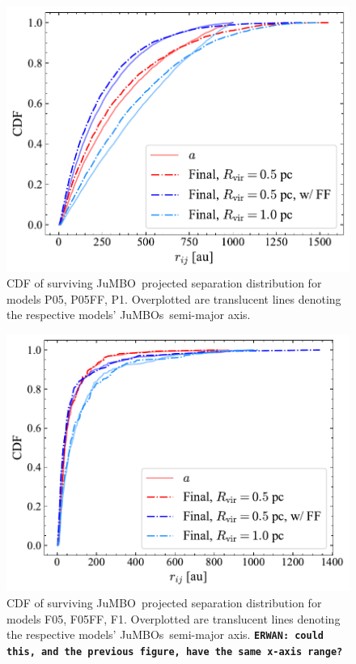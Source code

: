 \documentclass[submission,phys]{lib/SciPost}
\newcommand{\erwan}[1] {{\texttt{\textbf{ERWAN: #1}}} }
\newcommand{\jumbo}{\mbox{JuMBO}}
\newcommand{\jumbos}{\mbox{JuMBOs}}
\begin{document}
\begin{appendix}
    \begin{figure}
    \centering
        \includegraphics[width=0.75\columnwidth]{figures/Plummer_General_proj_sep.pdf}
        \caption{CDF of surviving \jumbo\, projected separation distribution for models P05, P05FF, P1. Overplotted are translucent lines denoting the respective models' \jumbos\, semi-major axis.}
         \label{Fig:Plummer_rsep}
   \end{figure}
   \begin{figure}
    \centering
        \includegraphics[width=0.75\columnwidth]{figures/Fractal_General_proj_sep.pdf}
        \caption{CDF of surviving \jumbo\, projected separation distribution for models F05, F05FF, F1. Overplotted are translucent lines denoting the respective models' \jumbos\, semi-major axis.
        \erwan{could this, and the previous figure, have the same x-axis range?}}
         \label{Fig:Fractal_rsep}
   \end{figure}
\end{appendix}
    
\end{document}
